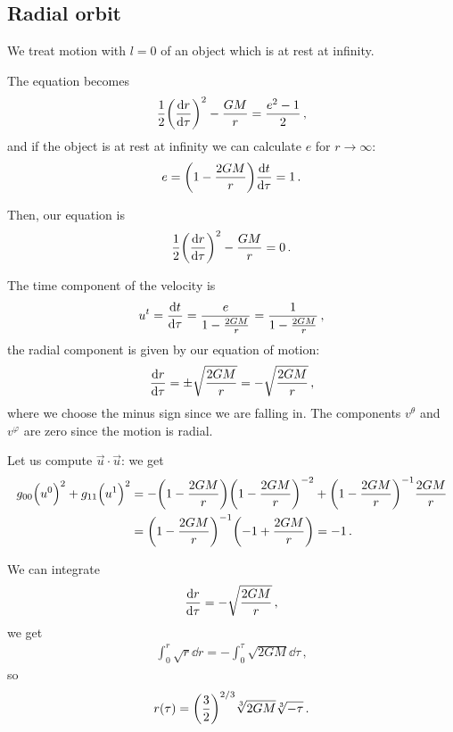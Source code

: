 \documentclass[main.tex]{subfiles}
\begin{document}
\subsection{Radial orbit}

We treat motion with \(l=0\) of an object which is at rest at infinity. 

The equation becomes 
%
\begin{align}
  \frac{1}{2} \qty(\dv{r}{\tau })^2 - \frac{GM}{r} = \frac{e^2 - 1}{2}
\,,
\end{align}
%
and if the object is at rest at infinity we can calculate \(e\) for \(r \rightarrow \infty\): 
%
\begin{align}
  e = \qty(1 - \frac{2GM}{r}) \dv{t}{\tau } = 1
\,. 
\end{align}

Then, our equation is 
%
\begin{align}
\frac{1}{2} \qty(\dv{r}{\tau })^2 - \frac{GM}{r} =0
\,. 
\end{align}
%

The time component of the velocity is 
%
\begin{align}
  u^{t} = \dv{t}{\tau } = \frac{e}{1 - \frac{2GM}{r}} = \frac{1}{1 - \frac{2GM}{r}} 
\,,
\end{align}
%
the radial component is given by our equation of motion: 
%
\begin{align}
  \dv{r}{\tau } = \pm \sqrt{\frac{2GM}{r}} = - \sqrt{\frac{2GM}{r}} 
\,,
\end{align}
%
where we choose the minus sign since we are falling in. The components \(v^{\theta }\) and \(v^{\varphi }\) are zero since the motion is radial.  

Let us compute \(\vec{u} \cdot \vec{u}\): we get 
%
\begin{subequations}
\begin{align}
  g_{00} \qty(u^{0})^2 + g_{11} \qty(u^{1})^2
  &= - \qty(1 - \frac{2GM}{r})\qty(1 - \frac{2GM}{r})^{-2}
  + \qty(1 - \frac{2GM}{r})^{-1} \frac{2GM}{r}  \\
  &= \qty(1 - \frac{2GM}{r})^{-1} \qty(-1 + \frac{2GM}{r})= -1 
\,.
\end{align}
\end{subequations}
%

We can integrate 
%
\begin{align}
  \dv{r}{\tau } = - \sqrt{\frac{2GM}{r}}
\,,
\end{align}
%
we get 
%
\begin{align}
  \int _{0}^{r} \sqrt{r} \dd{r} =- \int _{0}^{\tau } \sqrt{2GM} \dd{\tau }   
\,,
\end{align}
%
so 
%
\begin{align}
  r(\tau ) = \qty(\frac{3}{2})^{2/3} \sqrt[3]{2GM} \sqrt[3]{- \tau } 
\,.
\end{align}
\end{document}
